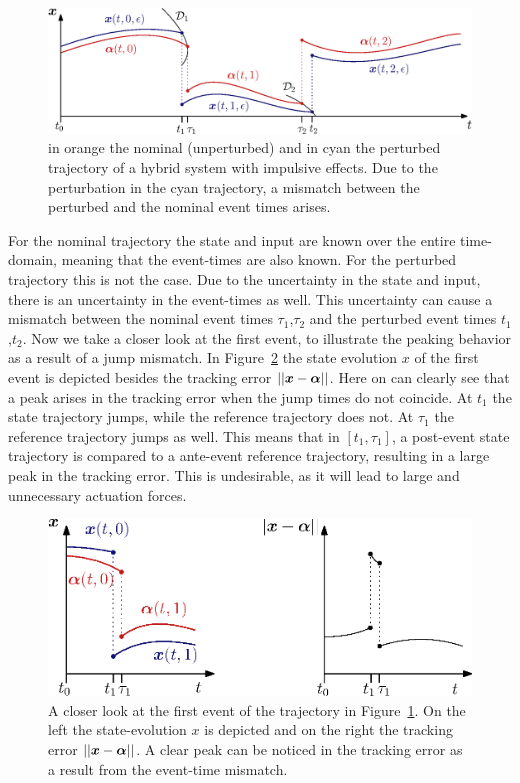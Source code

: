 \documentclass[../DC2017114Bouma.tex]{subfiles}
\begin{document}
%
%
\begin{figure}[h]
\centering
\includegraphics[width=.9\textwidth]{perturbedtraj.eps}\caption{in orange the nominal (unperturbed) and in cyan the perturbed trajectory of a hybrid system with impulsive effects. Due to the perturbation in the cyan trajectory, a mismatch between the perturbed and the nominal event times arises.} \label{fig:3perturbedtraj}
\end{figure}
For the nominal trajectory the state and input are known over the entire time-domain, meaning that the event-times are also known. For the perturbed trajectory this is not the case. Due to the uncertainty in the state and input, there is an uncertainty in the event-times as well. This uncertainty can cause a mismatch between the nominal event times $\tau_1$,$\tau_2$ and the perturbed event times $t_1$,$t_2$. Now we take a closer look at the first event, to illustrate the peaking behavior as a result of a jump mismatch. In Figure~\ref{fig:3peakerror} the state evolution $x$ of the first event is depicted besides the tracking error $||{\boldsymbol{x}}-\boldsymbol{\alpha}||$. Here on can clearly see that a peak arises in the tracking error when the jump times do not coincide. At $t_1$ the state trajectory jumps, while the reference trajectory does not. At $\tau_1$ the reference trajectory jumps as well. This means that in $[t_1,\tau_1]$, a post-event state trajectory is compared to a ante-event reference trajectory, resulting in a large peak in the tracking error. This is undesirable, as it will lead to large and unnecessary actuation forces.

\begin{figure}[h]
\centering
\includegraphics[width=.66\textwidth]{peakerror.eps}\caption{A closer look at the first event of the trajectory in Figure~\ref{fig:3perturbedtraj}. On the left the state-evolution $x$ is depicted and on the right the tracking error $||{\boldsymbol{x}}-\boldsymbol{\alpha}||$. A clear peak can be noticed in the tracking error as a result from the event-time mismatch.} \label{fig:3peakerror}
\end{figure}
\end{document}
